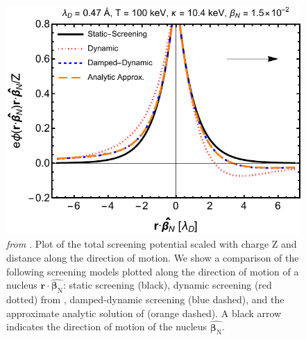 \begin{figure}[h!]
 \centering
 \includegraphics[width=.95\linewidth]{plots/chap03BBN/phidat_100_1_1_0_full.pdf}
 \caption{\textit{from \cite{Grayson:2023flr}}. Plot of the total screening potential scaled with charge Z and distance along the direction of motion. We show a comparison of the following screening models plotted along the direction of motion of a nucleus $\boldsymbol{r}\cdot\hat{\boldsymbol{\beta}_{\text{N}}}$: static screening (black), dynamic screening (red dotted) from \cite{Hwang:2021kno}, damped-dynamic screening (blue dashed), and the approximate analytic solution of  (orange dashed). A black arrow indicates the direction of motion of the nucleus $\hat{\boldsymbol{\beta}_{\text{N}}}$. }
 \label{fig:dynamiclinear}
\end{figure} 

